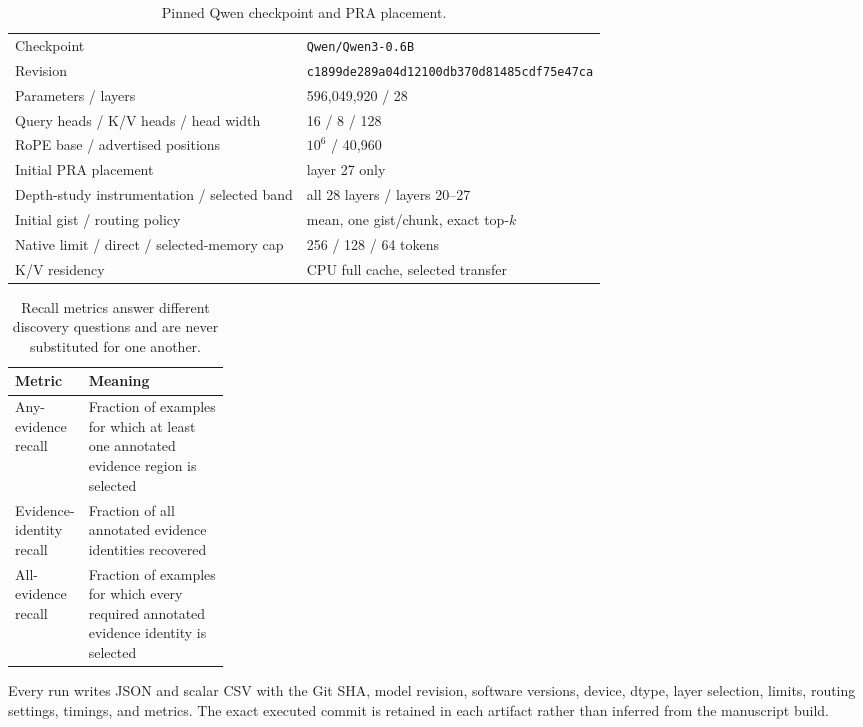 \documentclass[11pt]{article}
\begin{document}
\begin{table}[htbp]
\centering
\small
\caption{Pinned Qwen checkpoint and PRA placement.}
\label{tab:model}
\begin{tabular}{ll}
\toprule
Checkpoint & \texttt{Qwen/Qwen3-0.6B} \\
Revision & \texttt{c1899de289a04d12100db370d81485cdf75e47ca} \\
Parameters / layers & 596,049,920 / 28 \\
Query heads / K/V heads / head width & 16 / 8 / 128 \\
RoPE base / advertised positions & $10^6$ / 40,960 \\
Initial PRA placement & layer 27 only \\
Depth-study instrumentation / selected band & all 28 layers / layers 20--27 \\
Initial gist / routing policy & mean, one gist/chunk, exact top-$k$ \\
Native limit / direct / selected-memory cap & 256 / 128 / 64 tokens \\
K/V residency & CPU full cache, selected transfer \\
\bottomrule
\end{tabular}
\end{table}

\begin{table}[htbp]
\centering
\small
\caption{Recall metrics answer different discovery questions and are never substituted for one another.}
\label{tab:recall-definitions}
\begin{tabularx}{\linewidth}{L{0.25\linewidth}Y}
\toprule
Metric & Meaning \\
\midrule
Any-evidence recall & Fraction of examples for which at least one annotated evidence region is selected \\
Evidence-identity recall & Fraction of all annotated evidence identities recovered \\
All-evidence recall & Fraction of examples for which every required annotated evidence identity is selected \\
\bottomrule
\end{tabularx}
\end{table}

Every run writes JSON and scalar CSV with the Git SHA, model revision, software versions,
device, dtype, layer selection, limits, routing settings, timings, and metrics. The exact
executed commit is retained in each artifact rather than inferred from the manuscript build.
\end{document}
